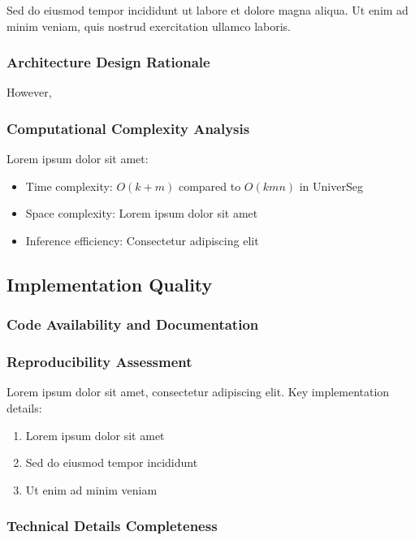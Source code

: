 Sed do eiusmod tempor incididunt ut labore et dolore magna aliqua. Ut enim ad minim veniam, quis nostrud exercitation ullamco laboris.

\subsubsection{Architecture Design Rationale}
 However, 

\subsubsection{Computational Complexity Analysis}
Lorem ipsum dolor sit amet:
\begin{itemize}
    \item Time complexity: $O(k + m)$ compared to $O(kmn)$ in UniverSeg
    \item Space complexity: Lorem ipsum dolor sit amet
    \item Inference efficiency: Consectetur adipiscing elit
\end{itemize}

\subsection{Implementation Quality}
\subsubsection{Code Availability and Documentation}

\subsubsection{Reproducibility Assessment}
Lorem ipsum dolor sit amet, consectetur adipiscing elit. Key implementation details:
\begin{enumerate}
    \item Lorem ipsum dolor sit amet
    \item Sed do eiusmod tempor incididunt
    \item Ut enim ad minim veniam
\end{enumerate}

\subsubsection{Technical Details Completeness}
